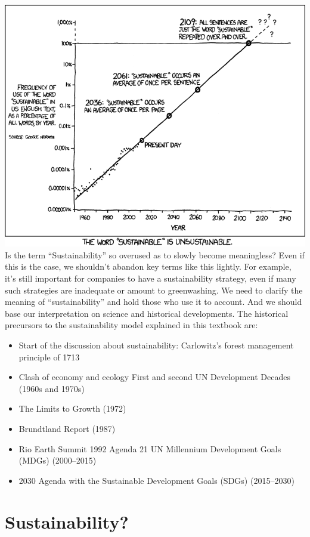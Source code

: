 \documentclass[
  letterpaper,
  DIV=11,
  numbers=noendperiod]{scrreprt}
\begin{document}
\includegraphics{1_understanding/images/sustainable-01.png}Is the term
``Sustainability'' so overused as to slowly become meaningless? Even if
this is the case, we shouldn't abandon key terms like this lightly. For
example, it's still important for companies to have a sustainability
strategy, even if many such strategies are inadequate or amount to
greenwashing. We need to clarify the meaning of ``sustainability'' and
hold those who use it to account. And we should base our interpretation
on science and historical developments. The historical precursors to the
sustainability model explained in this textbook are:

\begin{itemize}
\item
  Start of the discussion about sustainability: Carlowitz's forest
  management principle of 1713
\item
  Clash of economy and ecology First and second UN Development Decades
  (1960s and 1970s)
\item
  The Limits to Growth (1972)
\item
  Brundtland Report (1987)
\item
  Rio Earth Summit 1992 Agenda 21 UN Millennium Development Goals (MDGs)
  (2000--2015)
\item
  2030 Agenda with the Sustainable Development Goals (SDGs) (2015--2030)
\end{itemize}

\chapter{Sustainability?}\label{sustainability}
\end{document}
